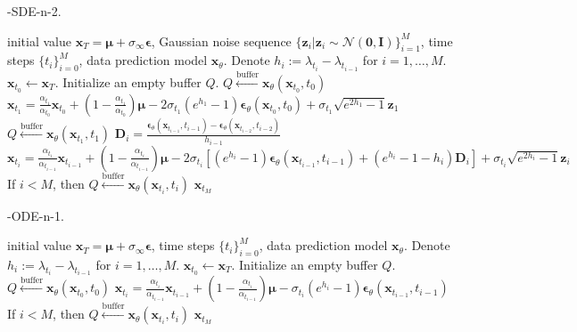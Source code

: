 \begin{algorithm}[H]
    \centering
    \caption{\ourmethod-SDE-n-2.}\label{alg:sde-n-2}
    \begin{algorithmic}[1]
    \REQUIRE initial value $\boldsymbol{x}_T=\boldsymbol\mu+\sigma_\infty\boldsymbol\epsilon$, Gaussian noise sequence $\{\boldsymbol{z}_i|\boldsymbol{z}_i\sim\mathcal{N}(\boldsymbol{0}, \boldsymbol{I})\}_{i=1}^M$, time steps $\{t_i\}_{i=0}^M$, data prediction model $\boldsymbol{x}_\theta$. Denote $h_i:=\lambda_{t_i}-\lambda_{t_{i-1}}$ for $i=1,\ldots,M$.
        \STATE $\boldsymbol{x}_{t_0}\leftarrow\boldsymbol{x}_T$. Initialize an empty buffer $Q$.
        \STATE $Q\xleftarrow{\text{buffer}}\boldsymbol{x}_\theta(\boldsymbol{x}_{t_0},t_0)$
        \STATE $\boldsymbol{x}_{t_1}=\frac{\alpha_{t_1}}{\alpha_{t_{0}}}\boldsymbol{x}_{t_{0}}
        +\left(1-\frac{\alpha_{t_1}}{\alpha_{t_{0}}}\right)\boldsymbol{\mu}-2\sigma_{t_1}(e^{h_1}-1)\boldsymbol{\epsilon}_\theta(\boldsymbol{x}_{t_{0}},t_{0})
        +\sigma_{t_1}\sqrt{e^{2h_1}-1}\boldsymbol{z}_1$
        \STATE $Q\xleftarrow{\text{buffer}}\boldsymbol{x}_\theta(\boldsymbol{x}_{t_1},t_1)$
        \STATE $\boldsymbol{D}_i=\frac{\boldsymbol{\epsilon}_\theta(\boldsymbol{x}_{t_{i-1}},t_{i-1})-\boldsymbol{\epsilon}_\theta(\boldsymbol{x}_{t_{i-2}},t_{i-2})}{h_{i-1}}$
        \STATE $\boldsymbol{x}_{t_{i}}=\frac{\alpha_{t_i}}{\alpha_{t_{i-1}}}\boldsymbol{x}_{t_{i-1}}
        +\left(1-\frac{\alpha_{t_i}}{\alpha_{t_{i-1}}}\right)\boldsymbol{\mu}-2\sigma_{t_i}\left[(e^{h_i}-1)\boldsymbol{\epsilon}_\theta(\boldsymbol{x}_{t_{i-1}},t_{i-1})+(e^{h_i}-1-h_i)\boldsymbol{D}_i \right]
        +\sigma_{t_i}\sqrt{e^{2h_i}-1}\boldsymbol{z}_i$
        \STATE If $i < M$, then $Q \xleftarrow{\text{buffer}} \boldsymbol{x}_\theta(\boldsymbol{x}_{t_i}, t_i)$
        \ENDFOR
        \RETURN $\boldsymbol{x}_{t_M}$
    \end{algorithmic}
\end{algorithm}

\begin{algorithm}[H]
    \centering
    \caption{\ourmethod-ODE-n-1.}\label{alg:ode-n-1}
    \begin{algorithmic}[1]
    \REQUIRE initial value $\boldsymbol{x}_T=\boldsymbol\mu+\sigma_\infty\boldsymbol\epsilon$, time steps $\{t_i\}_{i=0}^M$, data prediction model $\boldsymbol{x}_\theta$. Denote $h_i:=\lambda_{t_i}-\lambda_{t_{i-1}}$ for $i=1,\ldots,M$.
        \STATE $\boldsymbol{x}_{t_0}\leftarrow\boldsymbol{x}_T$. Initialize an empty buffer $Q$.
        \STATE $Q\xleftarrow{\text{buffer}}\boldsymbol{x}_\theta(\boldsymbol{x}_{t_0},t_0)$
        \STATE $\boldsymbol{x}_{t_{i}}=\frac{\alpha_{t_i}}{\alpha_{t_{i-1}}}\boldsymbol{x}_{t_{i-1}}
        +\left(1-\frac{\alpha_{t_i}}{\alpha_{t_{i-1}}}\right)\boldsymbol{\mu}-\sigma_{t_i}(e^{h_i}-1)\boldsymbol{\epsilon}_\theta(\boldsymbol{x}_{t_{i-1}},t_{i-1})$
        \STATE If $i < M$, then $Q \xleftarrow{\text{buffer}} \boldsymbol{x}_\theta(\boldsymbol{x}_{t_i}, t_i)$
        \ENDFOR
        \RETURN $\boldsymbol{x}_{t_M}$
    \end{algorithmic}
\end{algorithm}

